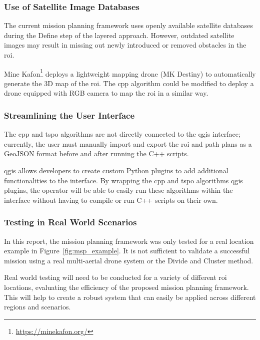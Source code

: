 \subsubsection{Use of Satellite Image Databases}
\label{sec:msp_satellite_database_limitation}

The current mission planning framework uses openly available satellite databases during the Define step of the layered approach. However, outdated satellite images may result in missing out newly introduced or removed obstacles in the \gls{roi}. 

Mine Kafon\footnote{\url{https://minekafon.org/}} deploys a lightweight mapping drone (MK Destiny) to automatically generate the 3D map of the \gls{roi}. The \gls{cpp} algorithm could be modified to deploy a drone equipped with RGB camera to map the \gls{roi} in a similar way.  

\subsubsection{Streamlining the User Interface}

The \gls{cpp} and \gls{tspo} algorithms are not directly connected to the \gls{qgis} interface; currently, the user must manually import and export the \gls{roi} and path plans as a GeoJSON format before and after running the C++ scripts. 

\gls{qgis} allows developers to create custom Python plugins to add additional functionalities to the interface. By wrapping the \gls{cpp} and \gls{tspo} algorithms \gls{qgis} plugins, the operator will be able to easily run these algorithms within the interface without having to compile or run C++ scripts on their own. 

\subsubsection{Testing in Real World Scenarios}

In this report, the mission planning framework was only tested for a real location example in Figure~\ref{fig:msp_example}. It is not sufficient to validate a successful mission using a real multi-aerial drone system or the Divide and Cluster method. 

Real world testing will need to be conducted for a variety of different \gls{roi} locations, evaluating the efficiency of the proposed mission planning framework. This will help to create a robust system that can easily be applied across different regions and scenarios. 